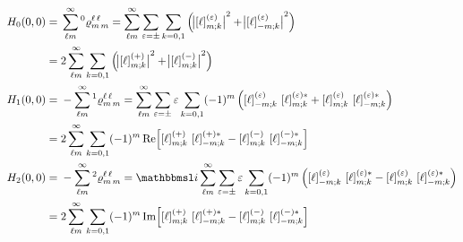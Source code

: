 \begin{align}
  H_0(0, 0)
  ={}& \sum_{\ell m}^\infty \prescript{0}{}{\varrho}^{\ell\, \ell}_{m\, m}
  = \sum_{\ell m}^\infty \sum_{\refl = \pm} \sum_{k = 0, 1}
  \rBrk[2]{\Abs[1]{\sBrk{\ell}^{(\refl)}_{m; k}}^2 + \Abs[1]{\sBrk{\ell}^{(\refl)}_{{-m}; k}}^2} \notag
  \\
  ={}& 2 \sum_{\ell m}^\infty \sum_{k = 0, 1}
  \rBrk[2]{\Abs[1]{\sBrk{\ell}^{(+)}_{m; k}}^2 + \Abs[1]{\sBrk{\ell}^{(-)}_{m; k}}^2}
  \\
  H_1(0, 0)
  ={}& -\sum_{\ell m}^\infty \prescript{1}{}{\varrho}^{\ell\, \ell}_{m\, m}
  = \sum_{\ell m}^\infty \sum_{\refl = \pm} \refl \sum_{k = 0, 1}
  (-1)^m \rBrk[2]{\sBrk{\ell}^{(\refl)}_{{-m}; k}\, \sBrk{\ell}^{(\refl) *}_{m; k}
  + \sBrk{\ell}^{(\refl)}_{m; k}\, \sBrk{\ell}^{(\refl) *}_{{-m}; k}} \notag
  \\
  ={}& 2 \sum_{\ell m}^\infty \sum_{k = 0, 1}
  (-1)^m \Re[2]{\sBrk{\ell}^{(+)}_{m; k}\, \sBrk{\ell}^{(+) *}_{{-m}; k} - \sBrk{\ell}^{(-)}_{m; k}\, \sBrk{\ell}^{(-) *}_{{-m}; k}}
  \\
  H_2(0, 0)
  ={}& -\sum_{\ell m}^\infty \prescript{2}{}{\varrho}^{\ell\, \ell}_{m\, m}
  = \imag \sum_{\ell m}^\infty \sum_{\refl = \pm} \refl \sum_{k = 0, 1}
  (-1)^m \rBrk[2]{\sBrk{\ell}^{(\refl)}_{{-m}; k}\, \sBrk{\ell}^{(\refl) *}_{m; k}
  - \sBrk{\ell}^{(\refl)}_{m; k}\, \sBrk{\ell}^{(\refl) *}_{{-m}; k}} \notag
  \\
  ={}& 2 \sum_{\ell m}^\infty \sum_{k = 0, 1}
  (-1)^m \Im[2]{\sBrk{\ell}^{(+)}_{m; k}\, \sBrk{\ell}^{(+) *}_{{-m}; k} - \sBrk{\ell}^{(-)}_{m; k}\, \sBrk{\ell}^{(-) *}_{{-m}; k}}
\end{align}
